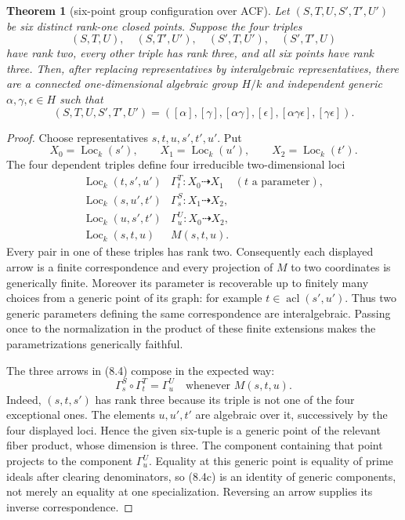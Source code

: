 \documentclass[11pt,oneside]{article}
\newtheorem{theorem}{Theorem}[section]
\theoremstyle{definition}
\theoremstyle{remark}
\newcommand{\acl}{\operatorname{acl}}
\newcommand{\Loc}{\operatorname{Loc}}
\begin{document}
\begin{theorem}[six-point group configuration over ACF]\label{thm:six-point-group}
Let $(S,T,U,S',T',U')$ be six distinct rank-one closed points.  Suppose the four triples
\[
 (S,T,U),\quad(S,T',U'),\quad(S',T,U'),\quad(S',T',U)
\]
have rank two, every other triple has rank three, and all six points have rank three.
Then, after replacing representatives by interalgebraic representatives, there are a
connected one-dimensional algebraic group $H/k$ and independent generic
$\alpha,\gamma,\epsilon\in H$ such that
\[
 (S,T,U,S',T',U')
 =([\alpha],[\gamma],[\alpha\gamma],[\epsilon],
   [\alpha\gamma\epsilon],[\gamma\epsilon]).                  \tag{8.3}
\]
\end{theorem}
\begin{proof}
Choose representatives $s,t,u,s',t',u'$.  Put
\[
 X_0=\Loc_k(s'),\qquad X_1=\Loc_k(u'),\qquad X_2=\Loc_k(t').
\]
The four dependent triples define four irreducible two-dimensional loci
\[
\begin{array}{c|c}
\Loc_k(t,s',u')&\Gamma^T_t:X_0\dashrightarrow X_1\quad(t\text{ a parameter}),\\
\Loc_k(s,u',t')&\Gamma^S_s:X_1\dashrightarrow X_2,\\
\Loc_k(u,s',t')&\Gamma^U_u:X_0\dashrightarrow X_2,\\
\Loc_k(s,t,u)&M(s,t,u).
\end{array}                                                    \tag{8.4}
\]
Every pair in one of these triples has rank two.  Consequently each displayed arrow is
a finite correspondence and every projection of $M$ to two coordinates is generically
finite.  Moreover its parameter is recoverable up to finitely many choices from a
generic point of its graph: for example
$t\in\acl(s',u')$.  Thus two generic parameters defining the same correspondence are
interalgebraic.  Passing once to the normalization in the product of these finite
extensions makes the parametrizations generically faithful.

The three arrows in (8.4) compose in the expected way:
\[
             \Gamma^S_s\circ\Gamma^T_t=\Gamma^U_u
             \quad\text{whenever }M(s,t,u).                   \tag{8.4c}
\]
Indeed, $(s,t,s')$ has rank three because its triple is not one of the four exceptional
ones.  The elements $u,u',t'$ are algebraic over it, successively by the four displayed
loci.  Hence the given six-tuple is a generic point of the relevant fiber product, whose
dimension is three.  The component containing that point projects to the component
$\Gamma^U_u$.  Equality at this generic point is equality of prime ideals after clearing
denominators, so (8.4c) is an identity of generic components, not merely an equality at
one specialization.  Reversing an arrow supplies its inverse correspondence.


\end{proof}
\end{document}
